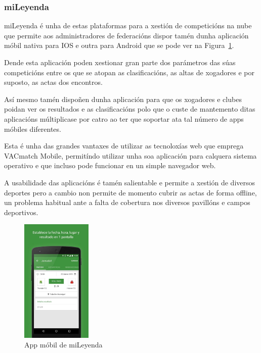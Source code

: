     \subsubsection{miLeyenda}

    miLeyenda é unha de estas plataformas para a xestión de competicións na 
nube que permite aos administradores de federacións dispor tamén dunha 
aplicación móbil nativa para IOS e outra para Android que se pode ver na 
Figura~\ref{fig:img:mileyenda}.

    Dende esta aplicación poden xestionar gran parte dos parámetros das súas competicións 
entre os que se atopan as clasificacións, as altas de xogadores e por 
suposto, as actas dos encontros.

    Así mesmo tamén dispoñen dunha aplicación para que os xogadores e clubes poidan ver 
os resultados e as clasificacións polo que o custe de mantemento ditas 
aplicacións múltiplicase por catro ao ter que soportar ata tal número de 
apps móbiles diferentes.

    Esta é unha das grandes vantaxes de utilizar as tecnoloxías web que emprega VACmatch 
Mobile, permitíndo utilizar unha soa aplicación para calquera sistema 
operativo e que incluso pode funcionar en un simple navegador web.

    A usabilidade das aplicacións é tamén salientable e permite a xestión de 
diversos deportes pero a cambio non permite de momento cubrir as actas de forma 
offline, un problema habitual ante a falta de cobertura nos diversos pavillóns e 
campos deportivos.

      \begin{figure}[h!]
	\begin{center}
	  \includegraphics[width=0.3\textwidth]{./img/mileyenda-app.png}
	  \caption{App móbil de miLeyenda}
	  \label{fig:img:mileyenda}
	\end{center}
      \end{figure}

